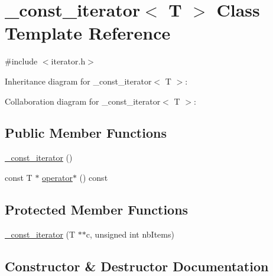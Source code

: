 \hypertarget{class__const__iterator}{}\section{\+\_\+const\+\_\+iterator$<$ T $>$ Class Template Reference}
\label{class__const__iterator}


{\ttfamily \#include $<$iterator.\+h$>$}



Inheritance diagram for \+\_\+const\+\_\+iterator$<$ T $>$\+:


Collaboration diagram for \+\_\+const\+\_\+iterator$<$ T $>$\+:
\subsection*{Public Member Functions}
\begin{DoxyCompactItemize}
\item 
\hyperlink{class__const__iterator_a1f72346a5b4c02d1d3bd6a6db401bd14}{\+\_\+const\+\_\+iterator} ()
\item 
const T $\ast$ \hyperlink{class__const__iterator_a4e96bb166986fd599ac8ffc0ef7a2215}{operator$\ast$} () const 
\end{DoxyCompactItemize}
\subsection*{Protected Member Functions}
\begin{DoxyCompactItemize}
\item 
\hyperlink{class__const__iterator_a956d1df48b9745da932632068cc2b938}{\+\_\+const\+\_\+iterator} (T $\ast$$\ast$c, unsigned int nb\+Items)
\end{DoxyCompactItemize}


\subsection{Constructor \& Destructor Documentation}
